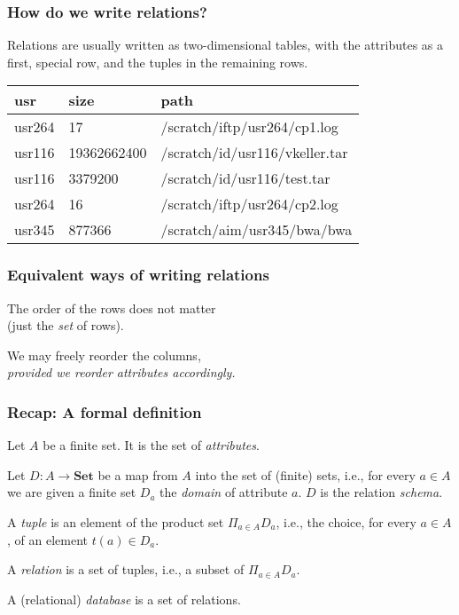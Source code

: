 \documentclass[english,serif,mathserif]{beamer}
\begin{document}
\begin{frame}
  \frametitle{How do we write relations?}

  Relations are usually written as two-dimensional tables, with the attributes
  as a first, special row, and the tuples in the remaining rows.

  \+
  \small
  \begin{center}
    \begin{tabular}{lll}
      \textbf{usr}
             & \textbf{size}
                           & \textbf{path}                  \\
      \hline
      usr264 &          17 & /scratch/iftp/usr264/cp1.log   \\
      usr116 & 19362662400 & /scratch/id/usr116/vkeller.tar \\
      usr116 &     3379200 & /scratch/id/usr116/test.tar    \\
      usr264 &          16 & /scratch/iftp/usr264/cp2.log   \\
      usr345 &      877366 & /scratch/aim/usr345/bwa/bwa    \\
    \end{tabular}
  \end{center}
\end{frame}


\begin{frame}
  \frametitle{Equivalent ways of writing relations}
  The order of the rows does not matter \\ (just the \emph{set} of rows).

  \+
  \alert<2>{%
    We may freely reorder the columns, \\
    \emph{provided we reorder attributes accordingly.}
  }%

  \+
\end{frame}


\begin{frame}
  \frametitle{Recap: A formal definition}
  \small

  Let $A$ be a finite set.  It is the set of \emph{attributes}.

  \+
  Let $D: A \to \mathbf{Set}$ be a map from $A$ into the set of (finite) sets,
  i.e., for every $a \in A$ we are given a finite set $D_a$ the \emph{domain} of
  attribute $a$.  $D$ is the relation \emph{schema}.

  \+
  A \emph{tuple} is an element of the product set $\Pi_{a \in A}D_a$, i.e., the choice,
  for every $a \in A$, of an element $t(a) \in D_a$.

  \+
  A \emph{relation} is a set of tuples, i.e., a subset of $\Pi_{a \in A}D_a$.

  \+
  A (relational) \emph{database} is a set of relations.
\end{frame}
\end{document}
